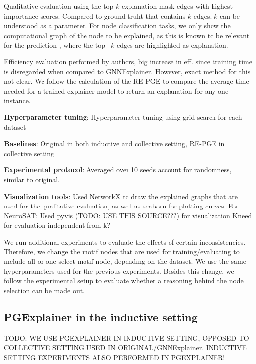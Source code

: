 Qualitative evaluation using the top-$k$ explanation mask edges with highest importance scores. Compared to ground truht that contains $k$ edges. $k$ can be understood as a parameter. For node classification tasks, we only show the computational graph of the node to be explained, as this is known to be relevant for the prediction \cite{}, where the top$-k$ edges are highlighted as explanation.

Efficiency evaluation performed by authors, big increase in eff. since training time is disregarded when compared to GNNExplainer. However, exact method for this not clear. We follow the calculation of the RE-PGE to compare the average time needed for a trained explainer model to return an explanation for any one instance.

\textbf{Hyperparameter tuning}: Hyperparameter tuning using grid search for each dataset

\textbf{Baselines}: Original in both inductive and collective setting, RE-PGE in collective setting

\textbf{Experimental protocol}: Averaged over 10 seeds account for randomness, similar to original.

\textbf{Visualization tools}: Used NetworkX \cite{SciPyProceedings_11} to draw the explained graphs that are used for the qualitative evaluation, as well as seaborn \cite{Waskom2021} for plotting curves.
For NeuroSAT: Used pyvis \cite{perrone2020network} (TODO: USE THIS SOURCE???) for visualization
Kneed for evaluation independent from k?


We run additional experiments to evaluate the effects of certain inconsistencies. Therefore, we change the motif nodes that are used for training/evaluating to include all or one select motif node, depending on the dataset. We use the same hyperparameters used for the previous experiments. Besides this change, we follow the experimental setup to evaluate whether a reasoning behind the node selection can be made out.

\subsection{PGExplainer in the inductive setting}


TODO: WE USE PGEXPLAINER IN INDUCTIVE SETTING, OPPOSED TO COLLECTIVE SETTING USED IN ORIGINAL/GNNExplainer. INDUCTIVE SETTING EXPERIMENTS ALSO PERFORMED IN PGEXPLAINER!



